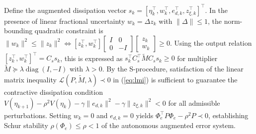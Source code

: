 \documentclass[journal]{IEEEtran}
\begin{document}
\begin{IEEEproof}
Define the augmented dissipation vector $s_k = [\eta_k^\top, w_k^\top, e_{d,k}^\top, z_{\xi,k}^\top]^\top$. In the presence of linear fractional uncertainty $w_k = \Delta z_k$ with $\|\Delta\| \le 1$, the norm-bounding quadratic constraint is $\|w_k\|^2 \le \|z_k\|^2 \iff [z_k^\top, w_k^\top] \begin{bmatrix} I & 0 \\ 0 & -I \end{bmatrix} \begin{bmatrix} z_k \\ w_k \end{bmatrix} \ge 0$. Using the output relation $[z_k^\top, w_k^\top]^\top = C_s s_k$, this is expressed as $s_k^\top C_s^\top \widetilde{M} C_s s_k \ge 0$ for multiplier $\widetilde{M} \succeq \lambda \operatorname{diag}(I, -I)$ with $\lambda > 0$. By the S-procedure, satisfaction of the linear matrix inequality $\mathcal{L}(P, \widetilde{M}, \lambda) \prec 0$ in (\ref{eq:lmi}) is sufficient to guarantee the contractive dissipation condition $V(\eta_{k+1}) - \rho^2 V(\eta_k) - \gamma \|e_{d,k}\|^2 - \gamma \|z_{\xi,k}\|^2 < 0$ for all admissible perturbations. Setting $w_k = 0$ and $e_{d,k} = 0$ yields $\Phi_e^\top P \Phi_e - \rho^2 P \prec 0$, establishing Schur stability $\rho(\Phi_e) \le \rho < 1$ of the autonomous augmented error system.


\end{IEEEproof}
\end{document}
